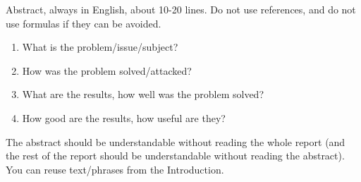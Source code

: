 Abstract, always in English, about 10-20 lines. Do not use references, and do not use formulas if they can be avoided.
\begin{enumerate}
\item What is the problem/issue/subject?
\item How was the problem solved/attacked?
\item What are the results, how well was the problem solved?
\item How good are the results, how useful are they?
\end{enumerate}
The abstract should be understandable without reading the whole report (and the rest of the report should be understandable without reading the abstract). You can reuse text/phrases from the Introduction.


